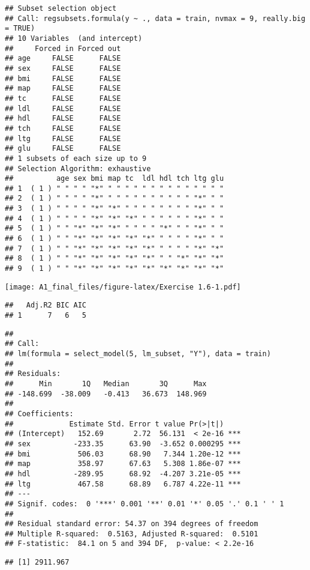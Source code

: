 \documentclass[
]{article}
\begin{document}
\begin{verbatim}
## Subset selection object
## Call: regsubsets.formula(y ~ ., data = train, nvmax = 9, really.big = TRUE)
## 10 Variables  (and intercept)
##     Forced in Forced out
## age     FALSE      FALSE
## sex     FALSE      FALSE
## bmi     FALSE      FALSE
## map     FALSE      FALSE
## tc      FALSE      FALSE
## ldl     FALSE      FALSE
## hdl     FALSE      FALSE
## tch     FALSE      FALSE
## ltg     FALSE      FALSE
## glu     FALSE      FALSE
## 1 subsets of each size up to 9
## Selection Algorithm: exhaustive
##          age sex bmi map tc  ldl hdl tch ltg glu
## 1  ( 1 ) " " " " "*" " " " " " " " " " " " " " "
## 2  ( 1 ) " " " " "*" " " " " " " " " " " "*" " "
## 3  ( 1 ) " " " " "*" "*" " " " " " " " " "*" " "
## 4  ( 1 ) " " " " "*" "*" "*" " " " " " " "*" " "
## 5  ( 1 ) " " "*" "*" "*" " " " " "*" " " "*" " "
## 6  ( 1 ) " " "*" "*" "*" "*" "*" " " " " "*" " "
## 7  ( 1 ) " " "*" "*" "*" "*" "*" " " " " "*" "*"
## 8  ( 1 ) " " "*" "*" "*" "*" "*" " " "*" "*" "*"
## 9  ( 1 ) " " "*" "*" "*" "*" "*" "*" "*" "*" "*"
\end{verbatim}

\texttt{[image: A1\_final\_files/figure-latex/Exercise 1.6-1.pdf]}

\begin{verbatim}
##   Adj.R2 BIC AIC
## 1      7   6   5
\end{verbatim}

\begin{verbatim}
## 
## Call:
## lm(formula = select_model(5, lm_subset, "Y"), data = train)
## 
## Residuals:
##      Min       1Q   Median       3Q      Max 
## -148.699  -38.009   -0.413   36.673  148.969 
## 
## Coefficients:
##             Estimate Std. Error t value Pr(>|t|)    
## (Intercept)   152.69       2.72  56.131  < 2e-16 ***
## sex          -233.35      63.90  -3.652 0.000295 ***
## bmi           506.03      68.90   7.344 1.20e-12 ***
## map           358.97      67.63   5.308 1.86e-07 ***
## hdl          -289.95      68.92  -4.207 3.21e-05 ***
## ltg           467.58      68.89   6.787 4.22e-11 ***
## ---
## Signif. codes:  0 '***' 0.001 '**' 0.01 '*' 0.05 '.' 0.1 ' ' 1
## 
## Residual standard error: 54.37 on 394 degrees of freedom
## Multiple R-squared:  0.5163, Adjusted R-squared:  0.5101 
## F-statistic:  84.1 on 5 and 394 DF,  p-value: < 2.2e-16
\end{verbatim}

\begin{verbatim}
## [1] 2911.967
\end{verbatim}
\end{document}
